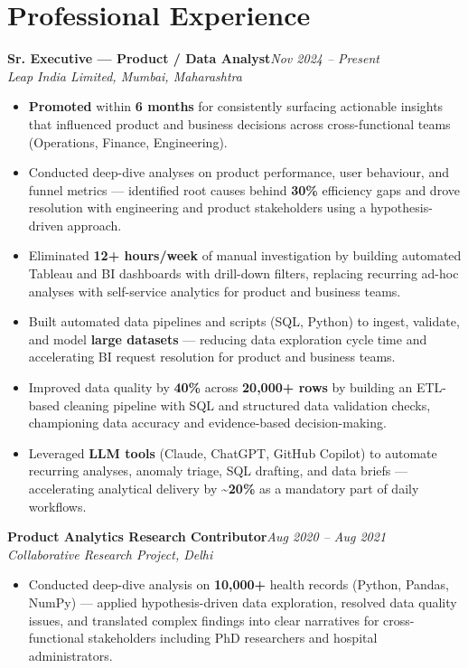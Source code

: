 \documentclass[10pt, letterpaper]{article}
\newcommand{\role}[3]{%
  \vspace{2pt}%
  {\bfseries #1}\hfill{\small\color{muted}\textit{#3}}\\[-2pt]%
  {\small\color{muted}\textit{#2}}%
}
\begin{document}
\section{Professional Experience}

\role{Sr. Executive — Product / Data Analyst}{Leap India Limited, Mumbai, Maharashtra}{Nov 2024 – Present}

\begin{itemize}
  \item \textbf{Promoted} within \textbf{6 months} for consistently surfacing actionable insights that influenced product and business decisions across cross-functional teams (Operations, Finance, Engineering).
  \item Conducted deep-dive analyses on product performance, user behaviour, and funnel metrics — identified root causes behind \textbf{30\%} efficiency gaps and drove resolution with engineering and product stakeholders using a hypothesis-driven approach.
  \item Eliminated \textbf{12+ hours/week} of manual investigation by building automated Tableau and BI dashboards with drill-down filters, replacing recurring ad-hoc analyses with self-service analytics for product and business teams.
  \item Built automated data pipelines and scripts (SQL, Python) to ingest, validate, and model \textbf{large datasets} — reducing data exploration cycle time and accelerating BI request resolution for product and business teams.
  \item Improved data quality by \textbf{40\%} across \textbf{20,000+ rows} by building an ETL-based cleaning pipeline with SQL and structured data validation checks, championing data accuracy and evidence-based decision-making.
  \item Leveraged \textbf{LLM tools} (Claude, ChatGPT, GitHub Copilot) to automate recurring analyses, anomaly triage, SQL drafting, and data briefs — accelerating analytical delivery by \textbf{\textasciitilde20\%} as a mandatory part of daily workflows.
\end{itemize}

\vspace{1pt}

\role{Product Analytics Research Contributor}{Collaborative Research Project, Delhi}{Aug 2020 – Aug 2021}

\begin{itemize}
  \item Conducted deep-dive analysis on \textbf{10,000+} health records (Python, Pandas, NumPy) — applied hypothesis-driven data exploration, resolved data quality issues, and translated complex findings into clear narratives for cross-functional stakeholders including PhD researchers and hospital administrators.
\end{itemize}
\end{document}
